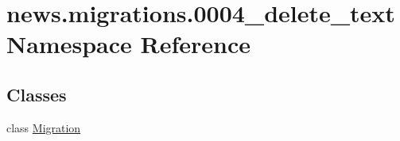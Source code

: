 \hypertarget{namespacenews_1_1migrations_1_10004__delete__text}{}\section{news.\+migrations.0004\+\_\+delete\+\_\+text Namespace Reference}
\label{namespacenews_1_1migrations_1_10004__delete__text}
\subsection*{Classes}
\begin{DoxyCompactItemize}
\item 
class \mbox{\hyperlink{classnews_1_1migrations_1_10004__delete__text_1_1_migration}{Migration}}
\end{DoxyCompactItemize}
